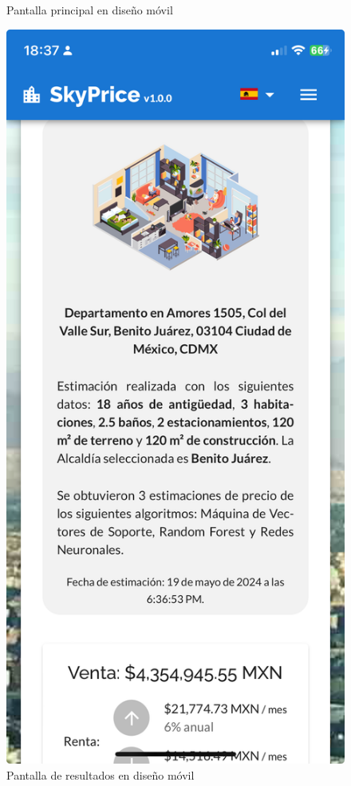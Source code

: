 \begin{figure}[H]
\begin{minipage}{0.45\textwidth}
        \caption{Pantalla principal en diseño móvil}
        \label{fig:main-responsive}
    \end{minipage}\hfill
    \begin{minipage}{0.45\textwidth}
        \centering
        \includegraphics[width=\textwidth]{imagenes/05-implementacion/interfaz-grafica/resultados-responsive.jpeg}
        \caption{Pantalla de resultados en diseño móvil}
        \label{fig:results-responsive}
    \end{minipage}
\end{figure}

